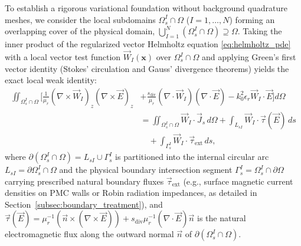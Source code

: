 \documentclass[VANCOUVER,Times1COL]{WileyNJD-v5}
\begin{document}
To establish a rigorous variational foundation without background quadrature meshes, we consider the local subdomains $\Omega_s^I \cap \Omega$ ($I = 1, \dots, N$) forming an overlapping cover of the physical domain, $\bigcup_{I=1}^N (\Omega_s^I \cap \Omega) \supseteq \Omega$. Taking the inner product of the regularized vector Helmholtz equation \eqref{eq:helmholtz_pde} with a local vector test function $\vec{W}_I(\mathbf{x})$ over $\Omega_s^I \cap \Omega$ and applying Green's first vector identity (Stokes' circulation and Gauss' divergence theorems) yields the exact local weak identity:
\begin{equation}
    \begin{aligned}
        \iint_{\Omega_s^I \cap \Omega} \bigg[ \frac{1}{\mu_r} (\nabla \times \vec{W}_I)_z (\nabla \times \vec{E})_z & + \frac{s_{\mathrm{div}}}{\mu_r} (\nabla \cdot \vec{W}_I) (\nabla \cdot \vec{E}) - k_0^2 \epsilon_r \vec{W}_I \cdot \vec{E} \bigg] d\Omega \\
                                                                                                                    & = \iint_{\Omega_s^I \cap \Omega} \vec{W}_I \cdot \vec{J}_s \, d\Omega + \int_{L_{sI}} \vec{W}_I \cdot \vec{\tau}(\vec{E}) \, ds \\
                                                                                                                    & \quad + \int_{\Gamma_s^I} \vec{W}_I \cdot \vec{\tau}_{\mathrm{ext}} \, ds,
    \end{aligned}
    \label{eq:local_weak_form}
\end{equation}
where $\partial(\Omega_s^I \cap \Omega) = L_{sI} \cup \Gamma_s^I$ is partitioned into the internal circular arc $L_{sI} = \partial\Omega_s^I \cap \Omega$ and the physical boundary intersection segment $\Gamma_s^I = \Omega_s^I \cap \partial\Omega$ carrying prescribed natural boundary fluxes $\vec{\tau}_{\mathrm{ext}}$ (e.g., surface magnetic current densities on PMC walls or Robin radiation impedances, as detailed in Section~\ref{subsec:boundary_treatment}), and $\vec{\tau}(\vec{E}) = \mu_r^{-1}(\vec{n} \times (\nabla \times \vec{E})) + s_{\mathrm{div}}\mu_r^{-1}(\nabla \cdot \vec{E})\vec{n}$ is the natural electromagnetic flux along the outward normal $\vec{n}$ of $\partial(\Omega_s^I \cap \Omega)$.
\end{document}
